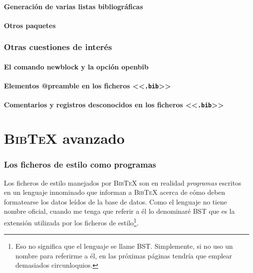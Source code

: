 \documentclass[a4paper,11pt]{article}
\def\btx-{\textsc{Bib\TeX}}
\def\ltr#1-{<<\texttt{#1}>>}
\def\tpf#1-{\ltr.#1-}
\begin{document}
\subsection{Generación de varias listas bibliográficas}
\label{sec:el-paquete-bibunits}


\subsection{Otros paquetes}
\label{sec:otros-paquetes}


\section{Otras cuestiones de interés}
\label{sec:intr-comand-ltx}

\subsection{El comando newblock y la opción openbib}
\label{sec:la-opcion-de}

\subsection{Elementos @preamble en los ficheros \tpf bib-}
\label{sec:elementos-preamble}

\subsection{Comentarios y registros desconocidos en los ficheros \tpf bib-}
\label{sec:elementos-comment}


\clearpage

\part{\btx- avanzado}
\label{part:btx-avanzado}

\section{Los ficheros de estilo como programas}
\label{sec:los-ficheros-de}

Los ficheros  de estilo manejados  por \btx- son en  realidad \emph{programas}
escritos en un  lenguaje innominado que informan a \btx-  acerca de cómo deben
formatearse los  datos leídos de la base  de datos. Como el  lenguaje no tiene
nombre oficial, cuando me  tenga que referir a él lo denominaré  BST que es la
extensión utilizada  por los ficheros de estilo\footnote{Eso  no significa que
  el lenguaje se llame BST. Simplemente,  si no uso un nombre para referirme a
  él, en las próximas páginas tendría que emplear demasiados circunloquios.}.
\end{document}
